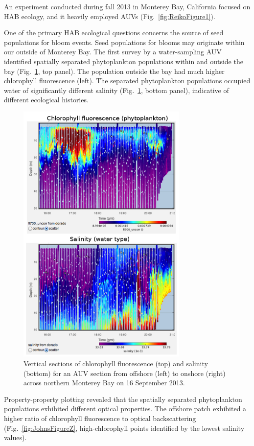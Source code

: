 An experiment conducted during fall 2013 in Monterey Bay, California focused on HAB ecology, and it heavily employed AUVs (Fig.~\ref{fig:ReikoFigure1}).  

One of the primary HAB ecological questions concerns the source of seed populations for bloom events.  Seed populations for blooms may originate within our outside of Monterey Bay.  The first survey by a water-sampling AUV identified spatially separated phytoplankton populations within and outside the bay (Fig.~\ref{fig:JohnsFigureY}, top panel).  The population outside the bay had much higher chlorophyll fluorescence (left).  The separated phytoplankton populations occupied water of significantly different salinity (Fig.~\ref{fig:JohnsFigureY}, bottom panel), indicative of different ecological histories.

\begin{figure}[htbp]
\centering
\includegraphics[width=3.3in]{JohnsFigureY.png}
\caption{Vertical sections of chlorophyll fluorescence (top) and salinity (bottom) for an AUV section from offshore (left) to onshore (right) across northern Monterey Bay on 16 September 2013.}
\label{fig:JohnsFigureY}
\end{figure}

Property-property plotting revealed that the spatially separated phytoplankton populations exhibited different optical properties.  The offshore patch exhibited a higher ratio of chlorophyll fluorescence to optical backscattering (Fig.~\ref{fig:JohnsFigureZ}, high-chlorophyll points identified by the lowest salinity values).

